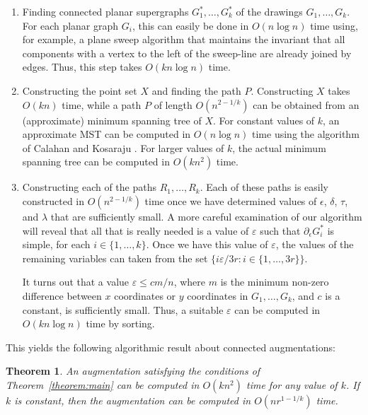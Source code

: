 \documentclass{patmorin}
\newtheorem{theorem}{Theorem}[section]
\begin{document}
\begin{enumerate}
  \item Finding connected planar supergraphs $G_1^*,\ldots,G_k^*$
  of the drawings $G_1,\ldots,G_k$.  For each planar graph $G_i$, this
  can easily be done in $O(n\log n)$ time using, for example, a plane
  sweep algorithm that maintains the invariant that all components with
  a vertex to the left of the sweep-line are already joined by edges.
  Thus, this step takes $O(kn\log n)$ time.

  \item Constructing the point set $X$ and finding the path
  $P$.  Constructing $X$ takes $O(kn)$ time, while a path $P$ of length
  $O(n^{2-1/k})$ can be obtained from an (approximate) minimum spanning
  tree of $X$.  For constant values of $k$, an approximate MST can
  be computed in $O(n\log n)$ time using the algorithm of Calahan and
  Kosaraju \cite{callahan.kosaraju:faster}.  For larger values of $k$,
  the actual minimum spanning tree can be computed in $O(kn^2)$ time.

  \item Constructing each of the paths $R_1,\ldots,R_k$.
  Each of these paths is easily constructed in $O(n^{2-1/k})$ time
  once we have determined values of $\epsilon$, $\delta$, $\tau$, and
  $\lambda$ that are sufficiently small.  A more careful examination
  of our algorithm will reveal that all that is really needed is
  a value of $\varepsilon$ such that $\partial_\epsilon G_i^*$ is
  simple, for each $i\in\{1,\ldots,k\}$.  Once we have this value of
  $\varepsilon$, the values of the remaining variables can taken from
  the set $\{i\varepsilon/3r:i\in\{1,\ldots,3r\}\}$.

  It turns out that a value $\varepsilon \le cm/n$, where $m$ is the
  minimum non-zero difference between $x$ coordinates or $y$ coordinates
  in $G_1,\ldots,G_k$, and $c$ is a constant, is sufficiently small.
  Thus, a suitable $\varepsilon$ can be computed in $O(kn\log n)$ time
  by sorting.
\end{enumerate}

This yields the following algorithmic result about connected augmentations:

\begin{theorem}
  An augmentation satisfying the conditions of Theorem~\ref{theorem:main}
  can be computed in $O(kn^2)$ time for any value of $k$.  If $k$ is
  constant, then the augmentation can be computed in $O(nr^{1-1/k})$
  time.
\end{theorem}
\end{document}
